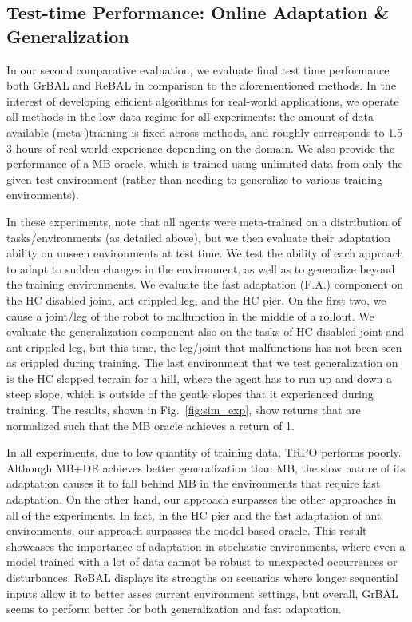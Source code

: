 \vspsubsec
\subsection{Test-time Performance: Online Adaptation \& Generalization}\label{sec:fast_adapt}
\vspsubsec

In our second comparative evaluation, we evaluate final test time performance both GrBAL and ReBAL in comparison to the aforementioned methods.
In the interest of developing efficient algorithms for real-world applications, we operate all methods in the low data regime for all experiments: the amount of data available (meta-)training is fixed across methods, and roughly corresponds to 1.5-3 hours of real-world experience depending on the domain. We also provide the performance of a MB oracle, which is trained using unlimited data from only the given test environment (rather than needing to generalize to various training environments).

In these experiments, note that all agents were meta-trained on a distribution of tasks/environments (as detailed above), but we then evaluate their adaptation ability on unseen environments at test time. We test the ability of each approach to adapt to sudden changes in the environment, as well as to generalize beyond the training environments. We evaluate the fast adaptation (F.A.) component on the HC disabled joint, ant crippled leg, and the HC pier. On the first two, we cause a joint/leg of the robot to malfunction in the middle of a rollout. We evaluate the generalization component also on the tasks of HC disabled joint and ant crippled leg, but this time, the leg/joint that malfunctions has not been seen as crippled during training. The last environment that we test generalization on is the HC slopped terrain for a hill, where the agent has to run up and down a steep slope, which is outside of the gentle slopes that it experienced during training. The results, shown in Fig.~\ref{fig:sim_exp}, show returns that are normalized such that the MB oracle achieves a return of 1.

In all experiments, due to low quantity of training data, TRPO performs poorly. Although MB+DE achieves better generalization than MB, the slow nature of its adaptation causes it to fall behind MB in the environments that require fast adaptation. On the other hand, our approach surpasses the other approaches in all of the experiments. In fact, in the HC pier and the fast adaptation of ant environments, our approach surpasses the model-based oracle. This result showcases the importance of adaptation in stochastic environments, where even a model trained with a lot of data cannot be robust to unexpected occurrences or disturbances. ReBAL displays its strengths on scenarios where longer sequential inputs allow it to better asses current environment settings, but overall, GrBAL seems to perform better for both generalization and fast adaptation.

